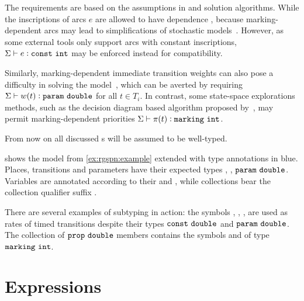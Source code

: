 \begin{remark}
  The requirements are based on the assumptions in  and  solution algorithms. While the inscriptions of arcs \(e\) are allowed to have dependence , because marking-dependent arcs may lead to simplifications of stochastic models~\citep{Ciardo93decomposition}. However, as some external tools only support arcs with constant inscriptions, \(\Sigma \vdash e \mathrel{\vcentcolon} \texttt{\upshape const}\ \texttt{\upshape int}\) may be enforced instead for compatibility.

  Similarly, marking-dependent immediate transition weights can also pose a difficulty in solving the model~\citep{Teruel03netlevel}, which can be averted by requiring \(\Sigma \vdash w(t) \mathrel{\vcentcolon} \texttt{\upshape param}\ \texttt{\upshape double}\) for all \(t \in T_i\). In contrast, some state-space explorations methods, such as the decision diagram based algorithm proposed by~\citet{Marussy17priorities}, may permit marking-dependent priorities \(\Sigma \vdash \pi(t) \mathrel{\vcentcolon} \texttt{\upshape marking}\ \texttt{\upshape int}\).
\end{remark}
  
From now on all discussed s will be assumed to be well-typed.

\begin{runningExample}
   shows the model from \vref{ex:rgspn:example} extended with type annotations in blue. Places, transitions and parameters have their expected types , , \(\texttt{\upshape param}\ \texttt{\upshape double}\). Variables are annotated according to their  and , while collections bear the collection qualifier suffix \lit{[]}.

  There are several examples of subtyping in action: the symbols , , ,  are used as rates of timed transitions despite their types \(\texttt{\upshape const}\ \texttt{\upshape double}\) and \(\texttt{\upshape param}\ \texttt{\upshape double}\). The collection  of \(\texttt{\upshape prop}\ \texttt{\upshape double}\) members contains the symbols  and  of type \(\texttt{\upshape marking}\ \texttt{\upshape int}\).
\end{runningExample}

\section{Expressions}
\label{sec:rgspn:expression}

